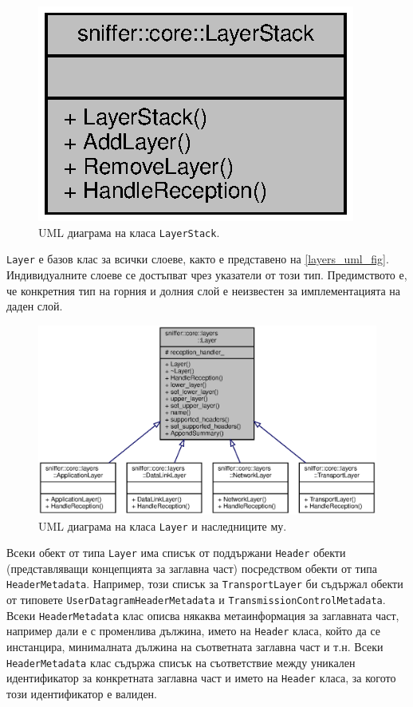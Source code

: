 \documentclass[12pt,a4paper,oneside]{book}
\begin{document}
\begin{figure}[h!]
  \centering
  \includegraphics[scale=.9]{figures/layer_stack_uml.eps}
  \caption{UML диаграма на класа \texttt{LayerStack}.}
  \label{layer_stack_uml_fig}
\end{figure}

\texttt{Layer} е базов клас за всички слоеве, както е представено на
\autoref{layers_uml_fig}.  Индивидуалните слоеве се достъпват чрез указатели
от този тип. Предимството е, че конкретния тип на горния и долния слой е
неизвестен за имплементацията на даден слой.

\begin{figure}[h!]
  \centering
  \includegraphics[scale=.7]{figures/layers_uml.eps}
  \caption{UML диаграма на класа \texttt{Layer} и наследниците му.}
  \label{layers_uml_fig}
\end{figure}

Всеки обект от типа \texttt{Layer} има списък от поддържани \texttt{Header}
обекти (представляващи концепцията за заглавна част) посредством обекти от типа
\texttt{HeaderMetadata}. Например, този списък за
\texttt{TransportLayer} би съдържал обекти от типовете
\texttt{UserDatagramHeaderMetadata} и \texttt{TransmissionControlMetadata}.
Всеки \texttt{HeaderMetadata} клас описва някаква метаинформация за
заглавната част,
например дали е с променлива дължина, името на
\texttt{Header} класа, който да се инстанцира, минималната дължина на
съответната заглавна част
и т.н. Всеки \texttt{HeaderMetadata} клас съдържа списък на съответствие между
уникален идентификатор за конкретната заглавна част и името на \texttt{Header}
класа, за когото този идентификатор е валиден.
\end{document}
